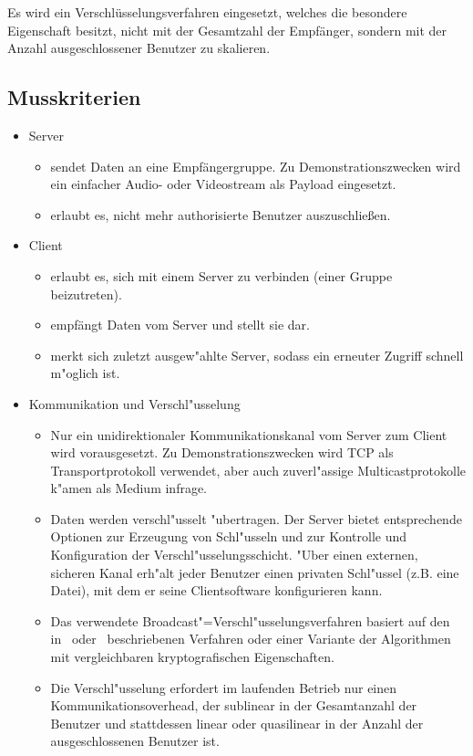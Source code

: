 \documentclass[a4paper,10pt]{scrartcl}
\begin{document}
Es wird ein Verschlüsselungsverfahren eingesetzt, welches die besondere
Eigenschaft besitzt, nicht mit der Gesamtzahl der Empfänger, sondern mit der Anzahl
ausgeschlossener Benutzer zu skalieren.

\subsection{Musskriterien}

\begin{itemize}

\item Server
\begin{itemize}
   \item sendet Daten an eine Empfängergruppe. Zu Demonstrationszwecken wird
         ein einfacher Audio- oder Videostream als Payload eingesetzt.
   \item erlaubt es, nicht mehr authorisierte Benutzer auszuschließen.
\end{itemize}

\item Client
\begin{itemize}
   \item erlaubt es, sich mit einem Server zu verbinden (einer Gruppe beizutreten).
   \item empfängt Daten vom Server und stellt sie dar.
   \item merkt sich zuletzt ausgew"ahlte Server, sodass ein erneuter Zugriff schnell
         m"oglich ist.
\end{itemize}

\item Kommunikation und Verschl"usselung
\begin{itemize}
   \item Nur ein unidirektionaler Kommunikationskanal vom Server zum Client wird
         vorausgesetzt. Zu Demonstrationszwecken wird TCP als Transportprotokoll
         verwendet, aber auch zuverl"assige Multicastprotokolle k"amen als Medium
         infrage.
   \item Daten werden verschl"usselt "ubertragen. Der Server bietet entsprechende
         Optionen zur Erzeugung von Schl"usseln und zur Kontrolle und Konfiguration
         der Verschl"usselungsschicht. "Uber einen externen, sicheren Kanal erh"alt
         jeder Benutzer einen privaten Schl"ussel (z.B. eine Datei), mit dem er seine
         Clientsoftware konfigurieren kann.
   \item Das verwendete Broadcast"=Verschl"usselungsverfahren basiert auf den
         in~\cite[Section~2.2]{Naor00} oder~\cite{Garg10} beschriebenen Verfahren
         oder einer Variante der Algorithmen mit vergleichbaren kryptografischen
         Eigenschaften.
   \item Die Verschl"usselung erfordert im laufenden Betrieb nur einen
         Kommunikationsoverhead, der sublinear in der Gesamtanzahl der Benutzer und
         stattdessen linear oder quasilinear in der Anzahl der ausgeschlossenen
         Benutzer ist.
\end{itemize}
\end{itemize}
\end{document}

